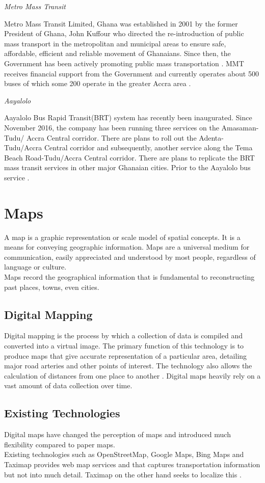 \textit{Metro Mass Transit}

Metro  Mass  Transit  Limited, Ghana was established in 2001 by the former President of Ghana, John Kuffour who directed the re-introduction of public mass transport in the metropolitan and municipal areas to ensure safe, affordable, efficient and reliable movement of Ghanaians. Since then, the Government has been actively promoting public mass transportation \citep{olateju2009appraisal}. MMT receives financial support from the Government and currently operates about 500 buses of which some 200 operate in the greater Accra area \citep{finn2009new}.

\textit{Aayalolo}

Aayalolo Bus Rapid Transit(BRT) system has recently been inaugurated. Since November 2016, the company has been running three services on the Amasaman-Tudu/
Accra Central corridor. There are plans to roll out the Adenta-Tudu/Accra Central corridor and subsequently, another service along the Tema Beach Road-Tudu/Accra Central corridor. There are plans to replicate the BRT mass transit services in other major Ghanaian cities. Prior to the Aayalolo bus service \citep{agyemang2017mode}.

\section{Maps}
A map is a graphic representation or scale model of spatial concepts. It is a means for conveying geographic information. Maps are a universal medium for communication, easily appreciated and understood by most people, regardless of language or culture. \\ Maps record the geographical information that is fundamental to reconstructing past places, towns, even cities.

\subsection{Digital Mapping}
Digital mapping is the process by which a collection of data is compiled and converted into a virtual image. The primary function of this technology is to produce maps that give accurate representation of a particular area, detailing major road arteries and other points of interest. The technology also allows the calculation of distances from one place to another \citep{husbyjonathon2008}. Digital maps heavily rely on a vast amount of data collection over time.

\subsection{Existing Technologies}
Digital maps have changed the perception of maps and introduced much flexibility compared to paper maps.\\ Existing technologies such as OpenStreetMap, Google Maps, Bing Maps and Taximap provides web map services and that captures transportation information but not into much detail. Taximap on the other hand seeks to localize this \citep{vinet2014arch}.

